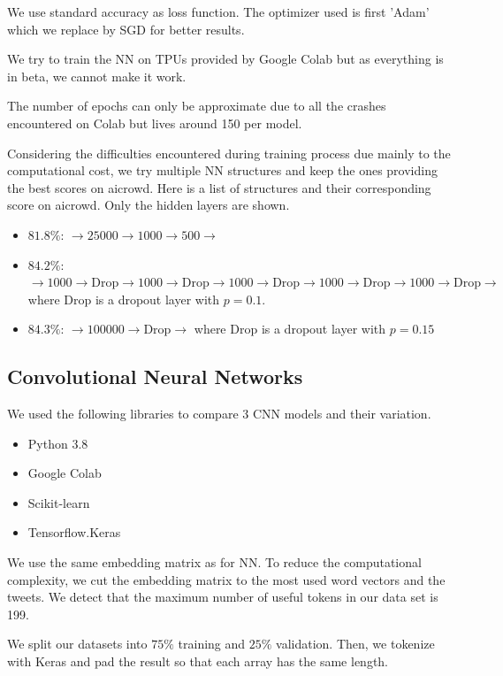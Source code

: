 \documentclass[11pt, a4paper, twocolumn]{article}
\begin{document}
We use standard accuracy as loss function. The optimizer used is first 'Adam' which we replace by SGD for better results.

We try to train the NN on TPUs provided by Google Colab but as everything is in beta, we cannot make it work.

The number of epochs can only be approximate due to all the crashes encountered on Colab but lives around 150 per model.

Considering the difficulties encountered during training process due mainly to the computational cost, we try multiple NN 
structures and keep the ones providing the best scores on aicrowd. 
Here is a list of structures and their corresponding score on aicrowd. Only the hidden layers are shown.
\begin{itemize}
  \item \textbf{$81.8\%$}: $\rightarrow 25000\rightarrow 1000\rightarrow 500\rightarrow $
  \item \textbf{$84.2\%$}: $\rightarrow 1000\rightarrow \text{Drop}\rightarrow 1000
  \rightarrow \text{Drop}\rightarrow 1000\rightarrow \text{Drop}\rightarrow 1000
  \rightarrow \text{Drop}\rightarrow 1000\rightarrow \text{Drop}\rightarrow $ where Drop is a dropout layer with $p=0.1$.
  \item \textbf{$84.3\%$}: $\rightarrow 100000\rightarrow \text{Drop}\rightarrow $ where Drop is a dropout layer with $p=0.15$
\end{itemize}

\subsection{Convolutional Neural Networks}
We used the following libraries to compare 3 CNN models and their variation.
\begin{itemize}
	\setlength\itemsep{1px}
	\item Python 3.8
	\item Google Colab
	\item Scikit-learn
	\item Tensorflow.Keras
\end{itemize}

We use the same embedding matrix as for NN\cite{glovepaper, gloveembedding}. To reduce the computational complexity, we cut the embedding matrix to the most used word vectors and the tweets. We detect that the maximum number of useful tokens in our data set is 199\label{199}.

We split our datasets into $75\%$ training and $25\%$ validation. Then, we tokenize with Keras and pad the result so that each array has the same length.
\end{document}

